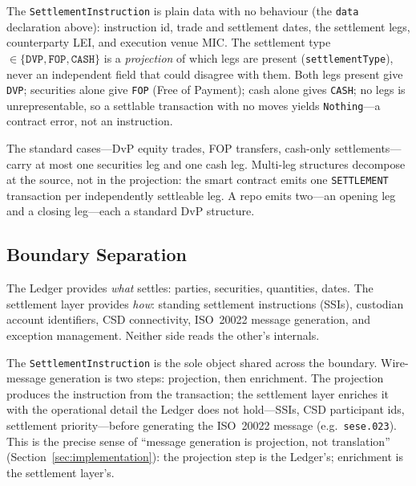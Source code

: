 \begin{definition}[SettlementInstruction]
\label{def:settlement-instruction}
The \texttt{SettlementInstruction} is plain data with no behaviour (the \texttt{data} declaration above): instruction id, trade and settlement dates, the settlement legs, counterparty LEI, and execution venue MIC. The settlement type $\in \{\texttt{DVP}, \texttt{FOP}, \texttt{CASH}\}$ is a \emph{projection} of which legs are present (\texttt{settlementType}), never an independent field that could disagree with them. Both legs present give \texttt{DVP}; securities alone give \texttt{FOP} (Free of Payment); cash alone gives \texttt{CASH}; no legs is unrepresentable, so a settlable transaction with no moves yields \texttt{Nothing}---a contract error, not an instruction.
\end{definition}

The standard cases---DvP equity trades, FOP transfers, cash-only settlements---carry at most one securities leg and one cash leg. Multi-leg structures decompose at the source, not in the projection: the smart contract emits one \texttt{SETTLEMENT} transaction per independently settleable leg. A repo emits two---an opening leg and a closing leg---each a standard DvP structure.

\subsection{Boundary Separation}
\label{sec:settlement-boundary}

\begin{principle}
\label{prin:settlement-boundary}
The Ledger provides \emph{what} settles: parties, securities, quantities, dates. The settlement layer provides \emph{how}: standing settlement instructions (SSIs), custodian account identifiers, CSD connectivity, ISO~20022 message generation, and exception management. Neither side reads the other's internals.
\end{principle}

The \texttt{SettlementInstruction} is the sole object shared across the boundary. Wire-message generation is two steps: projection, then enrichment. The projection produces the instruction from the transaction; the settlement layer enriches it with the operational detail the Ledger does not hold---SSIs, CSD participant ids, settlement priority---before generating the ISO~20022 message (e.g.\ \texttt{sese.023}). This is the precise sense of ``message generation is projection, not translation'' (Section~\ref{sec:implementation}): the projection step is the Ledger's; enrichment is the settlement layer's.

